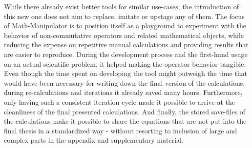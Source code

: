 While there already exist better tools for similar use-cases, the introduction of this new one does not aim to replace, imitate or upstage any of them.
The focus of Math-Manipulator is to position itself as a playground to experiment with the behavior of non-commutative operators and related mathematical objects, while reducing the expense on repetitive manual calculations and providing results that are easier to reproduce.
During the development process and the first-hand usage on an actual scientific problem, it helped making the operator behavior tangible.
Even though the time spent on developing the tool might outweigh the time that would have been necessary for writing down the final version of the calculations, during re-calculations and iterations it already saved many hours.
Furthermore, only having such a consistent iteration cycle made it possible to arrive at the cleanliness of the final presented calculations.
And finally, the stored save-files of the calculations make it possible to share the equations that are not put into the final thesis in a standardized way - without resorting to inclusion of large and complex parts in the appendix and supplementary material.
